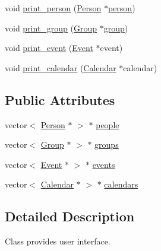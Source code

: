 \begin{DoxyCompactItemize}
\item 
void \hyperlink{classUserInterface_a45a7ad6cca95218631d8c6fbe49362e2}{print\_\-person} (\hyperlink{classPerson}{Person} $\ast$\hyperlink{group__content_8h_ab8664e6fd42f01eeaad084b5e20eb54e}{person})
\item 
void \hyperlink{classUserInterface_a31424519b61f71584a4a5196c6632beb}{print\_\-group} (\hyperlink{classGroup}{Group} $\ast$\hyperlink{group__content_8h_a27517aa1480ab2d9bfe5d62e693b33eb}{group})
\item 
void \hyperlink{classUserInterface_aca628f5a276b39ff4346e2150b419590}{print\_\-event} (\hyperlink{classEvent}{Event} $\ast$event)
\item 
void \hyperlink{classUserInterface_aca95eaf06d053b4ac267e94ccb84e501}{print\_\-calendar} (\hyperlink{classCalendar}{Calendar} $\ast$calendar)
\end{DoxyCompactItemize}
\subsection*{Public Attributes}
\begin{DoxyCompactItemize}
\item 
vector$<$ \hyperlink{classPerson}{Person} $\ast$ $>$ $\ast$ \hyperlink{classUserInterface_a3d0914e9d2ba661bc3691397c695287e}{people}
\item 
vector$<$ \hyperlink{classGroup}{Group} $\ast$ $>$ $\ast$ \hyperlink{classUserInterface_a12676e629660c43c63eb5b01c5c19bc3}{groups}
\item 
vector$<$ \hyperlink{classEvent}{Event} $\ast$ $>$ $\ast$ \hyperlink{classUserInterface_ae3370dc0d02c19b4b1cc7c47221c2bfa}{events}
\item 
vector$<$ \hyperlink{classCalendar}{Calendar} $\ast$ $>$ $\ast$ \hyperlink{classUserInterface_abd1f3233d3e666415f6cdf8458b50faa}{calendars}
\end{DoxyCompactItemize}


\subsection{Detailed Description}
Class provides user interface. 

